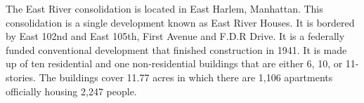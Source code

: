 The East River consolidation is located in East Harlem, Manhattan. This consolidation is a single development known as East River Houses. It is bordered by East 102nd and East 105th, First Avenue and F.D.R Drive. It is a federally funded conventional development that finished construction in 1941. It is made up of ten residential and one non-residential buildings that are either 6, 10, or 11-stories. The buildings cover 11.77 acres in which there are 1,106 apartments officially housing 2,247 people.